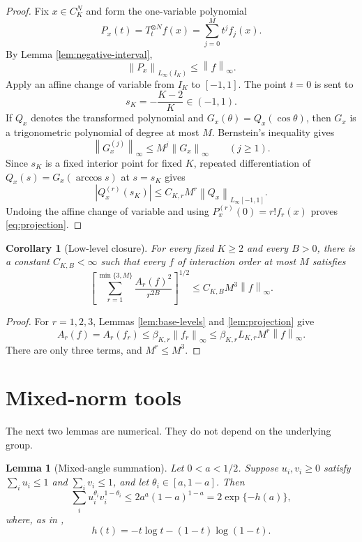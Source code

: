 \documentclass[11pt]{article}
\newtheorem{lemma}[theorem]{Lemma}
\newtheorem{corollary}[theorem]{Corollary}
\theoremstyle{definition}
\theoremstyle{remark}
\newcommand{\norm}[1]{\left\lVert #1\right\rVert}
\newcommand{\abs}[1]{\left\lvert #1\right\rvert}
\begin{document}
\begin{proof}
Fix $x\in C_K^N$ and form the one-variable polynomial
\begin{equation}
\label{eq:Px}
 P_x(t)=T_t^{\otimes N}f(x)
 =\sum_{j=0}^M t^j f_j(x).
\end{equation}
By Lemma \ref{lem:negative-interval},
\begin{equation}
\label{eq:Px-bound}
 \norm{P_x}_{L_\infty(I_K)}\le\norm f_\infty.
\end{equation}
Apply an affine change of variable from $I_K$ to $[-1,1]$.  The point $t=0$
is sent to
\[
 s_K=-\frac{K-2}{K}\in(-1,1).
\]
If $Q_x$ denotes the transformed polynomial and
$G_x(\theta)=Q_x(\cos\theta)$, then $G_x$ is a trigonometric polynomial of
degree at most $M$.  Bernstein's inequality gives
\[
 \norm{G_x^{(j)}}_\infty\le M^j\norm{G_x}_\infty
 \qquad(j\ge1).
\]
Since $s_K$ is a fixed interior point for fixed $K$, repeated differentiation
of $Q_x(s)=G_x(\arccos s)$ at $s=s_K$ gives
\[
 \abs{Q_x^{(r)}(s_K)}
 \le C_{K,r}M^r\norm{Q_x}_{L_\infty[-1,1]}.
\]
Undoing the affine change of variable and using
$P_x^{(r)}(0)=r!f_r(x)$ proves \eqref{eq:projection}.
\end{proof}

\begin{corollary}[Low-level closure]
\label{cor:low}
For every fixed $K\ge2$ and every $B>0$, there is a constant
$C_{K,B}<\infty$ such that every $f$ of interaction order at most $M$
satisfies
\begin{equation}
\label{eq:low}
 \left[
  \sum_{r=1}^{\min\{3,M\}}
  \frac{A_r(f)^2}{r^{2B}}
 \right]^{1/2}
 \le C_{K,B}M^3\norm f_\infty.
\end{equation}
\end{corollary}

\begin{proof}
For $r=1,2,3$, Lemmas \ref{lem:base-levels} and \ref{lem:projection} give
\[
 A_r(f)=A_r(f_r)
 \le\beta_{K,r}\norm{f_r}_\infty
 \le\beta_{K,r}L_{K,r}M^r\norm f_\infty.
\]
There are only three terms, and $M^r\le M^3$.
\end{proof}

\section{Mixed-norm tools}

The next two lemmas are numerical.  They do not depend on the underlying
group.

\begin{lemma}[Mixed-angle summation]
\label{lem:mixed-angle}
Let $0<a<1/2$.  Suppose $u_i,v_i\ge0$ satisfy
$\sum_i u_i\le1$ and $\sum_i v_i\le1$, and let
$\theta_i\in[a,1-a]$.  Then
\begin{equation}
\label{eq:mixed-angle}
 \sum_i u_i^{\theta_i}v_i^{1-\theta_i}
 \le 2a^a(1-a)^{1-a}
 =2\exp\{-h(a)\},
\end{equation}
where, as in \cite[Lemma 5.2]{PellegrinoTeixeira},
\begin{equation}
\label{eq:entropy}
 h(t)=-t\log t-(1-t)\log(1-t).
\end{equation}
\end{lemma}
\end{document}
